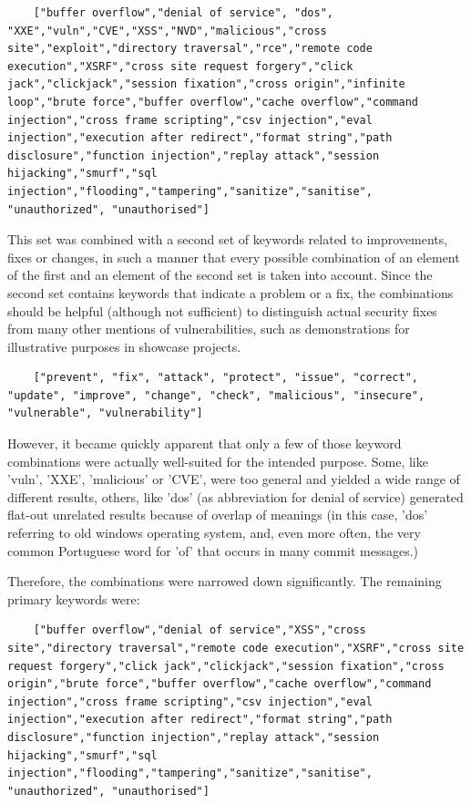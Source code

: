 \documentclass[
a4paper,
pagesize,
pdftex,
12pt,
twoside, %
BCOR=5mm, %
ngerman,
fleqn,
final,
]{scrartcl}
\begin{document}
	\begin{lstlisting}
	["buffer overflow","denial of service", "dos", "XXE","vuln","CVE","XSS","NVD","malicious","cross site","exploit","directory traversal","rce","remote code execution","XSRF","cross site request forgery","click jack","clickjack","session fixation","cross origin","infinite loop","brute force","buffer overflow","cache overflow","command injection","cross frame scripting","csv injection","eval injection","execution after redirect","format string","path disclosure","function injection","replay attack","session hijacking","smurf","sql injection","flooding","tampering","sanitize","sanitise", "unauthorized", "unauthorised"]
	\end{lstlisting}
	This set was combined with a second set of keywords related to improvements, fixes or changes, in such a manner that every possible combination of an element of the first and an element of the second set is taken into account. Since the second set contains keywords that indicate a problem or a fix, the combinations should be helpful (although not sufficient) to distinguish actual security fixes from many other mentions of vulnerabilities, such as demonstrations for illustrative purposes in showcase projects.
	\begin{lstlisting}
	["prevent", "fix", "attack", "protect", "issue", "correct", "update", "improve", "change", "check", "malicious", "insecure", "vulnerable", "vulnerability"]
	\end{lstlisting}
	However, it became quickly apparent that only a few of those keyword combinations were actually well-suited for the intended purpose. Some, like 'vuln', 'XXE', 'malicious' or 'CVE', were too general and yielded a wide range of different results, others, like 'dos' (as abbreviation for denial of service) generated flat-out unrelated results because of overlap of meanings (in this case, 'dos' referring to old windows operating system, and, even more often, the very common Portuguese word for 'of' that occurs in many commit messages.)
	
	Therefore, the combinations were narrowed down significantly. The remaining primary keywords were:
	\begin{lstlisting}
	["buffer overflow","denial of service","XSS","cross site","directory traversal","remote code execution","XSRF","cross site request forgery","click jack","clickjack","session fixation","cross origin","brute force","buffer overflow","cache overflow","command injection","cross frame scripting","csv injection","eval injection","execution after redirect","format string","path disclosure","function injection","replay attack","session hijacking","smurf","sql injection","flooding","tampering","sanitize","sanitise", "unauthorized", "unauthorised"]
	\end{lstlisting}
	
\end{document}
